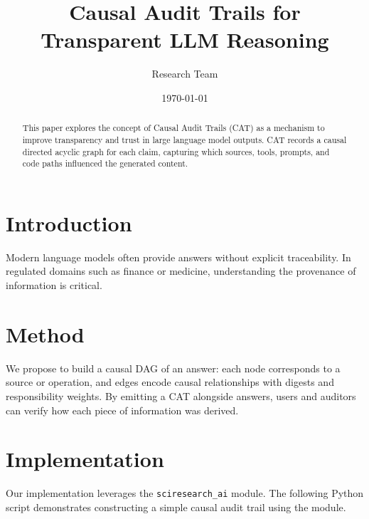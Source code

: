 \documentclass{article}
\title{Causal Audit Trails for Transparent LLM Reasoning}
\author{Research Team}
\date{\today}
\begin{document}
\maketitle

\begin{abstract}
This paper explores the concept of Causal Audit Trails (CAT) as a mechanism to
improve transparency and trust in large language model outputs. CAT records a
causal directed acyclic graph for each claim, capturing which sources, tools,
prompts, and code paths influenced the generated content.
\end{abstract}

\section{Introduction}
Modern language models often provide answers without explicit traceability. In
regulated domains such as finance or medicine, understanding the provenance of
information is critical.

\section{Method}
We propose to build a causal DAG of an answer: each node corresponds to a
source or operation, and edges encode causal relationships with digests and
responsibility weights. By emitting a CAT alongside answers, users and auditors
can verify how each piece of information was derived.

\section{Implementation}
Our implementation leverages the \texttt{sciresearch\_ai} module. The
following Python script demonstrates constructing a simple causal audit trail
using the module.
\end{document}
